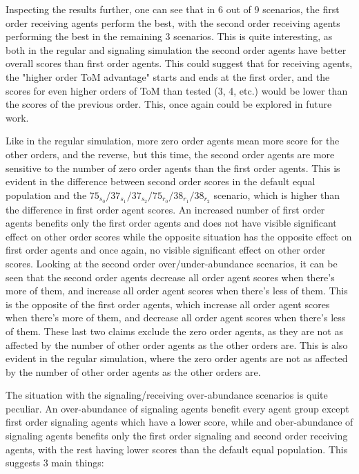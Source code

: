 Inspecting the results further, one can see that in 6 out of 9 scenarios, the first order receiving agents perform the best, with the second order receiving agents performing the best in the remaining 3 scenarios. This is quite interesting, as both in the regular and signaling simulation the second order agents have better overall scores than first order agents. This could suggest that for receiving agents, the "higher order ToM advantage" starts and ends at the first order, and the scores for even higher orders of ToM than tested (3, 4, etc.) would be lower than the scores of the previous order. This, once again could be explored in future work.

Like in the regular simulation, more zero order agents mean more score for the other orders, and the reverse, but this time, the second order agents are more sensitive to the number of zero order agents than the first order agents. This is evident in the difference between second order scores in the default equal population and the $75_{s_{0}}/37_{s_{1}}/37_{s_{2}}/75_{r_{0}}/38_{r_{1}}/38_{r_{2}}$ scenario, which is higher than the difference in first order agent scores. An increased number of first order agents benefits only the first order agents and does not have visible significant effect on other order scores while the opposite situation has the opposite effect on first order agents and once again, no visible significant effect on other order scores. Looking at the second order over/under-abundance scenarios, it can be seen that the second order agents decrease all order agent scores when there's more of them, and increase all order agent scores when there's less of them. This is the opposite of the first order agents, which increase all order agent scores when there's more of them, and decrease all order agent scores when there's less of them. These last two claims exclude the zero order agents, as they are not as affected by the number of other order agents as the other orders are. This is also evident in the regular simulation, where the zero order agents are not as affected by the number of other order agents as the other orders are.

The situation with the signaling/receiving over-abundance scenarios is quite peculiar. An over-abundance of signaling agents benefit every agent group except first order signaling agents which have a lower score, while and ober-abundance of signaling agents benefits only the first order signaling and second order receiving agents, with the rest having lower scores than the default equal population. This suggests 3 main things:

